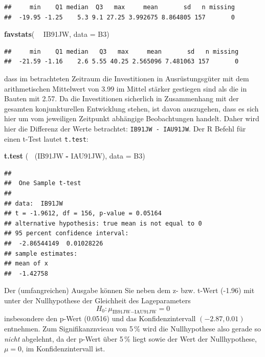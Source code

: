 \documentclass[12pt,ngerman,paper=a4,pagesize,DIV=13]{scrreprt}
\newenvironment{Shaded}{\begin{snugshade}}{\end{snugshade}}
\newcommand{\DataTypeTok}[1]{\textcolor[rgb]{0.13,0.29,0.53}{#1}}
\newcommand{\KeywordTok}[1]{\textcolor[rgb]{0.13,0.29,0.53}{\textbf{#1}}}
\newcommand{\NormalTok}[1]{#1}
\newcommand{\OperatorTok}[1]{\textcolor[rgb]{0.81,0.36,0.00}{\textbf{#1}}}
\newcommand{\StringTok}[1]{\textcolor[rgb]{0.31,0.60,0.02}{#1}}
\begin{document}
\begin{verbatim}
##     min    Q1 median  Q3   max     mean       sd   n missing
##  -19.95 -1.25    5.3 9.1 27.25 3.992675 8.864805 157       0
\end{verbatim}

\begin{Shaded}
\begin{Highlighting}[]
\KeywordTok{favstats}\NormalTok{( }\OperatorTok{~}\StringTok{ }\NormalTok{IB91JW, }\DataTypeTok{data =}\NormalTok{ B3)}
\end{Highlighting}
\end{Shaded}

\begin{verbatim}
##     min    Q1 median   Q3   max     mean       sd   n missing
##  -21.59 -1.16    2.6 5.55 40.25 2.565096 7.481063 157       0
\end{verbatim}

dass im betrachteten Zeitraum die Investitionen in Ausrüstungsgüter mit
dem arithmetischen Mittelwert von 3.99 im Mittel stärker gestiegen sind
als die in Bauten mit 2.57. Da die Investitionen sicherlich in
Zusammenhang mit der gesamten konjunkturellen Entwicklung stehen, ist
davon auszugehen, dass es sich hier um vom jeweiligen Zeitpunkt
abhängige Beobachtungen handelt. Daher wird hier die Differenz der Werte
betrachtet: \texttt{IB91JW\ -\ IAU91JW}. Der R Befehl für einen t-Test
lautet \texttt{t.test}:

\begin{Shaded}
\begin{Highlighting}[]
\KeywordTok{t.test}\NormalTok{ (}\OperatorTok{~}\StringTok{ }\NormalTok{(IB91JW }\OperatorTok{-}\StringTok{ }\NormalTok{IAU91JW), }\DataTypeTok{data =}\NormalTok{ B3)}
\end{Highlighting}
\end{Shaded}

\begin{verbatim}
## 
##  One Sample t-test
## 
## data:  IB91JW
## t = -1.9612, df = 156, p-value = 0.05164
## alternative hypothesis: true mean is not equal to 0
## 95 percent confidence interval:
##  -2.86544149  0.01028226
## sample estimates:
## mean of x 
##  -1.42758
\end{verbatim}

Der (umfangreichen) Ausgabe können Sie neben dem z- bzw. t-Wert (-1.96)
mit unter der Nullhypothese der Gleichheit des Lageparameters
\[H_0: \mu_{\text{IB91JW}-\text{IAU91JW}}=0\] insbesondere den p-Wert
(0.0516) und das Konfidenzintervall \((-2.87, 0.01)\) entnehmen. Zum
Signifikanznvieau von 5\(\,\)\% wird die Nullhypothese also gerade so
\emph{nicht} abgelehnt, da der p-Wert über 5\(\,\)\% liegt sowie der
Wert der Nullhypothese, \(\mu=0\), im Konfidenzintervall ist.
\end{document}
